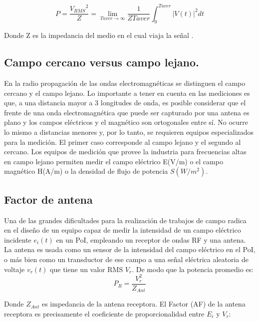 \begin{equation} \label{equ_sesenta_dos}
	 P = \dfrac{{V_{RMS}}^{2}}{Z} = \lim_{Taver \to \infty} \dfrac{1}{Z Taver} \int_{0}^{Taver} |V(t)|^{2} dt 
\end{equation}

Donde Z es la impedancia del medio en el cual viaja la señal . \\

\subsection{Campo cercano versus campo lejano. }

En la radio propagación de las ondas electromagnéticas se distinguen el campo cercano y el campo lejano. Lo importante a tener en cuenta en las mediciones es que, a una distancia mayor a 3 longitudes de onda, es posible considerar que el frente de una onda electromagnética que puede ser capturado por una antena es plano y los campos eléctricos y el magnético son ortogonales entre sí. No ocurre lo mismo a distancias menores y, por lo tanto, se requieren equipos especializados para la medición. El primer caso corresponde al campo lejano y el segundo al cercano. Los equipos de medición que provee la industria para frecuencias altas en campo lejano permiten medir el campo eléctrico E(V/m) o el campo magnético H(A/m) o la densidad de flujo de potencia $S(W/m^{2})$. \\

\subsection{Factor de antena} 

Una de las grandes dificultades para la realización de trabajos de campo radica en el diseño de un equipo capaz de medir la intensidad de un campo eléctrico incidente $e_i (t)$ en un PoI, empleando un receptor de ondas RF y una antena. La antena es usada como un sensor de la intensidad del campo eléctrico en el PoI, o más bien como un transductor de ese campo a una señal eléctrica aleatoria de voltaje $v_r (t)$ que tiene un valor RMS $V_r$. De modo que la potencia promedio es:   \\


\begin{equation} \label{equ_sesenta_tres}
	 P_R= \dfrac{V_r^{2}}{Z_{Ant}}
\end{equation}

Donde $Z_{Ant}$ es impedancia de la antena receptora. El Factor (AF) de la antena receptora es precisamente el coeficiente de proporcionalidad entre  $E_i$ y $V_r$:

